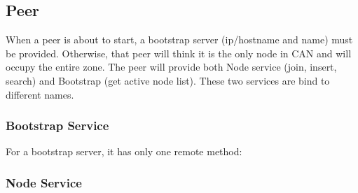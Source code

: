 \documentclass[11pt, oneside]{article}   	%
\begin{document}
\subsection{Peer}
When a peer is about to start, a bootstrap server (ip/hostname and name) must be provided. Otherwise, that peer will think it is the only node in CAN and will occupy the entire zone.
The peer will provide both Node service (join, insert, search) and Bootstrap (get active node list). These two services are bind to different names.

\subsubsection{Bootstrap Service}
For a bootstrap server, it has only one remote method:

\subsubsection{Node Service}
\end{document}
